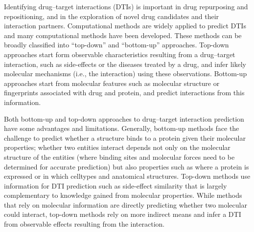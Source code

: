 \documentclass{bioinfo}
\renewcommand{\cite}{\citep}
\begin{document}

Identifying drug--target interactions (DTIs) is important in drug
repurposing and repositioning, and in the exploration of novel drug
candidates and their interaction partners. Computational methods are
widely applied to predict DTIs and many computational methods have
been developed.  These methods can be broadly classified into
``top-down'' and ``bottom-up'' approaches. Top-down approaches start
form observable characteristics resulting from a drug--target
interaction, such as side-effects or the diseases treated by a drug,
and infer likely molecular mechanisms (i.e., the interaction) using
these observations.
Bottom-up approaches start from molecular features such as molecular
structure or fingerprints associated with drug and protein, and
predict interactions from this information.

Both bottom-up and top-down approaches to drug--target interaction
prediction have some advantages and limitations. Generally, bottom-up
methods face the challenge to predict whether a structure binds to a
protein given their molecular properties; whether two entities
interact depends not only on the molecular structure of the entities
(where binding sites and molecular forces need to be determined for
accurate prediction) but also properties such as where a protein is
expressed or in which celltypes and anatomical structures. Top-down
methods use information for DTI prediction such as side-effect
similarity \cite{Campillos2008} that is largely complementary to
knowledge gained from molecular properties. While methods that rely on
molecular information are directly predicting whether two molecular
could interact, top-down methods rely on more indirect means and 
infer a DTI from observable effects resulting from the interaction.
\end{document}
